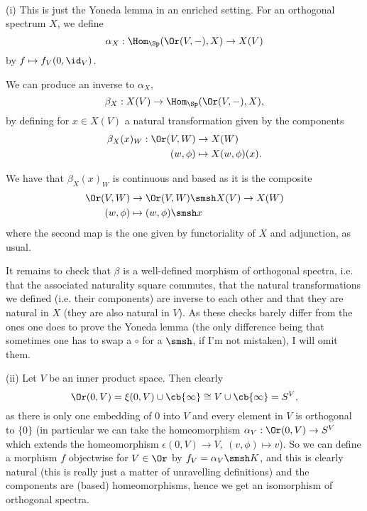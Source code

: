 
\def \L{\mathbb{L}}
\def \O{\mathcal{O}}

\renewcommand{\Xi}{{\mbox{\larger[2]$\pmb\xi$}}}


\mmaketitle

\begin{exercise}[1]\ 

(i) This is just the Yoneda lemma in an enriched setting. For an orthogonal spectrum $X$, we define
\[\alpha_X:\Hom_\Sp(\Or(V,-),X)\to X(V)\]
by $f\mapsto f_V(0, \id_V)$.

We can produce an inverse to $\alpha_X$,
\[\beta_X:X(V)\to\Hom_\Sp(\Or(V,-),X),\]
by defining for $x\in X(V)$ a natural transformation given by the components
\begin{align*}
    \beta_X(x)_W:\Or(V,W)&\to X(W)\\
    (w,\phi)&\mapsto X(w,\phi)(x).
\end{align*}

We have that $\beta_X(x)_W$ is continuous and based as it is the composite
\begin{align*}
\Or(V,W)&\to\Or(V,W)\smsh X(V)\to X(W)\\
(w,\phi)&\mapsto(w,\phi)\smsh x
\end{align*}
where the second map is the one given by functoriality of $X$ and adjunction, as usual.

It remains to check that $\beta$ is a well-defined morphism of orthogonal spectra, i.e. that the associated naturality square commutes, that the natural transformations we defined (i.e. their components) are inverse to each other and that they are natural in $X$ (they are also natural in $V$). As these checks barely differ from the ones one does to prove the Yoneda lemma (the only difference being that sometimes one has to swap a $\circ$ for a $\smsh$, if I'm not mistaken), I will omit them.

(ii) Let $V$ be an inner product space. Then clearly \[\Or(0,V)=\xi(0,V)\cup\cb{\infty}\cong
V\cup\cb{\infty} = S^V,\]
as there is only one embedding of $0$ into $V$ and every element in $V$ is
orthogonal to $\{0\}$ (in particular we can take the homeomorphism $\alpha_V:\Or(0,V)\to S^V$ which extends the homeomorphism $\epsilon(0,V)\to V,\ (v,\phi)\mapsto v$). So we can define a morphism $f$ objectwise for $V\in\Or$ by $f_V=\alpha_V\smsh K$, and this is clearly natural (this is really just a matter of unravelling definitions) and the components are (based) homeomorphisms, hence we get an isomorphism of orthogonal
spectra.
\end{exercise}\newpage

